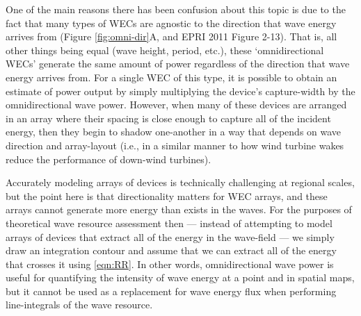One of the main reasons there has been confusion about this topic is due to the fact that many types of WECs are agnostic to the direction that wave energy arrives from (Figure \ref{fig:omni-dir}A, and EPRI 2011 Figure 2-13). That is, all other things being equal (wave height, period, etc.), these `omnidirectional WECs' generate the same amount of power regardless of the direction that wave energy arrives from. For a single WEC of this type, it is possible to obtain an estimate of power output by simply multiplying the device's capture-width by the omnidirectional wave power. However, when many of these devices are arranged in an array where their spacing is close enough to capture all of the incident energy, then they begin to shadow one-another in a way that depends on wave direction and array-layout (i.e., in a similar manner to how wind turbine wakes reduce the performance of down-wind turbines).

Accurately modeling arrays of devices is technically challenging at regional scales, but the point here is that directionality matters for WEC arrays, and these arrays cannot generate more energy than exists in the waves. For the purposes of theoretical wave resource assessment then — instead of attempting to model arrays of devices that extract all of the energy in the wave-field — we simply draw an integration contour and assume that we can extract all of the energy that crosses it using \eqref{eqn:RR}. In other words, omnidirectional wave power is useful for quantifying the intensity of wave energy at a point and in spatial maps, but it cannot be used as a replacement for wave energy flux when performing line-integrals of the wave resource.

